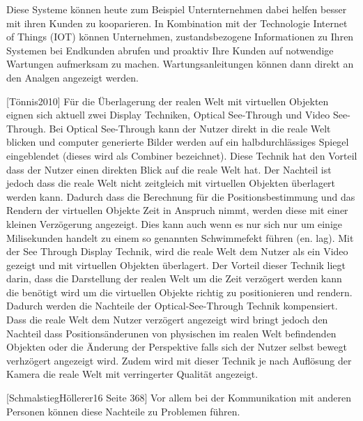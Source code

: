 Diese Systeme können heute zum Beispiel Unternternehmen dabei helfen besser mit ihren Kunden zu kooparieren. In Kombination mit der Technologie Internet of Things (IOT)  können Unternehmen,
zustandsbezogene Informationen zu Ihren Systemen bei Endkunden abrufen und proaktiv Ihre Kunden auf notwendige Wartungen aufmerksam zu machen. Wartungsanleitungen können dann direkt 
an den Analgen angezeigt werden.%

[Tönnis2010] Für die Überlagerung der realen Welt mit virtuellen Objekten eignen sich aktuell zwei Display Techniken,  Optical See-Through und Video See-Through. 
Bei Optical See-Through kann der Nutzer direkt in die reale Welt blicken und computer generierte Bilder werden auf ein halbdurchlässiges Spiegel eingeblendet (dieses wird als Combiner bezeichnet).
Diese Technik hat den Vorteil dass der Nutzer einen direkten Blick auf die reale Welt hat. Der Nachteil ist jedoch dass die reale Welt nicht zeitgleich mit virtuellen Objekten überlagert werden kann. 
Dadurch dass die Berechnung für die Positionsbestimmung und das Rendern der virtuellen Objekte Zeit in Anspruch nimmt, werden diese mit einer kleinen Verzögerung angezeigt. Dies kann auch 
wenn es nur sich nur um einige Milisekunden handelt zu einem so genannten Schwimmefekt führen (en. lag). Mit der See Through Display Technik, wird die reale Welt dem Nutzer als ein Video 
gezeigt und mit virtuellen Objekten überlagert. Der Vorteil dieser Technik liegt darin, dass die Darstellung der realen Welt um die Zeit verzögert werden kann die benötigt wird um die virtuellen Objekte 
richtig zu positionieren und rendern. Dadurch werden die Nachteile der Optical-See-Through Technik kompensiert. Dass die reale Welt dem Nutzer verzögert angezeigt wird bringt jedoch den Nachteil 
dass Positionsänderunen von physischen im realen Welt befindenden Objekten oder die Änderung der Perspektive falls sich der Nutzer selbst bewegt verhzögert angezeigt wird. Zudem wird mit 
dieser Technik je nach Auflösung der Kamera die reale Welt mit verringerter Qualität angezeigt.

[SchmalstiegHöllerer16 Seite 368] Vor allem bei der Kommunikation mit anderen Personen können diese Nachteile zu Problemen führen. 

